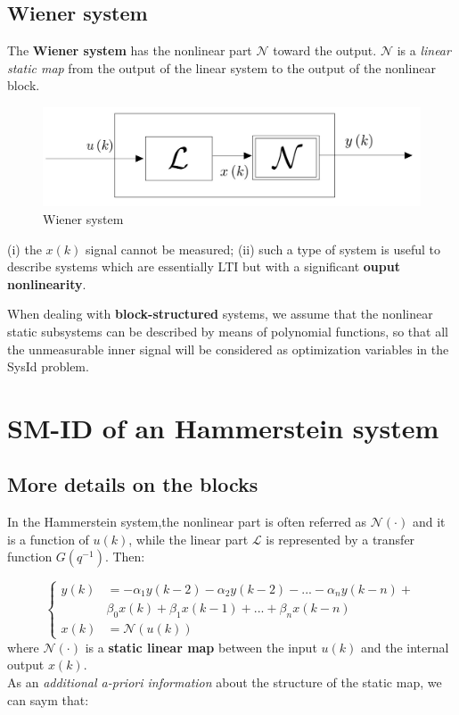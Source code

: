 \subsection{Wiener system}
The \textbf{Wiener system} has the nonlinear part $\mathcal{N}$ toward the output. $\mathcal{N}$ is a \textit{linear static map} from the output of the linear system to the output of the nonlinear block.
\begin{figure}[h]
    \centering
    \includegraphics[scale=0.2]{img/Wiener.jpg}
    \caption{Wiener system}
\end{figure}
\begin{remark}
    (i) the $x(k)$ signal cannot be measured; (ii) such a type of system is useful to describe systems which are essentially LTI but with a significant \textbf{ouput nonlinearity}.
\end{remark}
When dealing with \textbf{block-structured} systems, we assume that the nonlinear static subsystems can be described by means of polynomial functions, so that all the unmeasurable inner signal will be considered as optimization variables in the SysId problem. 
\section{SM-ID of an Hammerstein system}
\subsection{
    More details on the blocks
}
In the Hammerstein system,the nonlinear part is often referred as $\mathcal{N}(\cdot)$ and it is a function of $u(k)$, while the linear part $\mathcal{L}$ is represented by a transfer function $G(q^{-1})$. Then: 

\begin{equation}\label{eq:hammer}
    \begin{cases}
        y(k)&=-\alpha_1{y(k-2)}-\alpha_2{y(k-2)}-...-\alpha_n{y(k-n)}+\\
        &\beta_0{x(k)}+\beta_1{x(k-1)}+...+\beta_n{x(k-n)}\\
        x(k)&=\mathcal{N}(u(k))
    \end{cases}
\end{equation}
where $\mathcal{N}(\cdot)$ is a \textbf{static linear map} between the input $u(k)$ and the internal output $x(k)$.\\
As an \textit{additional a-priori information} about the structure of the static map, we can saym that:

